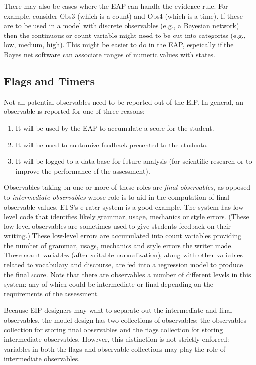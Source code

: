 \documentclass{article}
\begin{document}
  There may also be cases where the EAP can handle the evidence rule.
  For example, consider Obs3 (which is a count) and Obs4 (which is a
  time).  If these are to be used in a model with discrete observables
  (e.g., a Bayesian network) then the continuous or count variable
  might need to be cut into categories (e.g., low, medium, high).
  This might be easier to do in the EAP, espeically if the Bayes net
  software can associate ranges of numeric values with states.
  
  \subsection{Flags and Timers}
  \label{sub:flags}

  Not all potential observables need to be reported out of the EIP.
  In general, an observable is reported for one of three reasons:
  \begin{enumerate}
  \item It will be used by the EAP to accumulate a score for the
    student.
  \item It will be used to customize feedback presented to the
    students.
  \item It will be logged to a data base for future analysis
      (for scientific research or to improve the performance
    of the assessment). 
  \end{enumerate}

  Observables taking on one or more of these roles are \textit{final
    observables}, as opposed to \textit{intermediate observables}
  whose role is to aid in the computation of final observable values.
  ETS's e-rater{\registered} system \cite{eRater} is a good example.
  The system has low level code that identifies likely grammar, usage,
  mechanics or style errors.  (These low level observables are
  sometimes used to give students feedback on their writing.)  These
  low-level errors are accumulated into count variables providing the
  number of grammar, usage, mechanics and style errors the writer
  made.  These count variables (after suitable normalization), along
  with other variables related to vocabulary and discourse, are fed
  into a regression model to produce the final score.  Note that there
  are observables a number of different levels in this system:  any of
  which could be intermediate or final depending on the requirements
  of the assessment.
  
  Because EIP designers may want to separate out the intermediate and
  final observables, the model design has two collections of
  observables:  the observables collection for storing final
  observables and the flags collection for storing intermediate
  observables.  However, this distinction is not strictly enforced:
  variables in both the flags and observable collections may play the
  role of intermediate observables.
\end{document}

